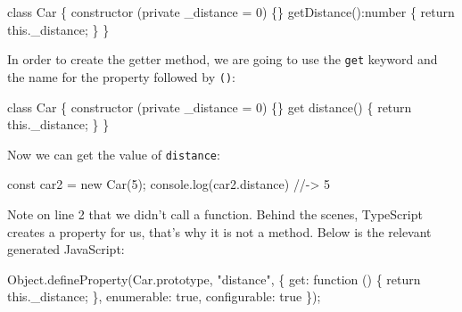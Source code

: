 \documentclass[12pt,]{article}
\newenvironment{Shaded}{}{}
\newcommand{\KeywordTok}[1]{\textcolor[rgb]{0.00,0.00,1.00}{{#1}}}
\newcommand{\DataTypeTok}[1]{{#1}}
\newcommand{\DecValTok}[1]{{#1}}
\newcommand{\StringTok}[1]{\textcolor[rgb]{0.00,0.50,0.50}{{#1}}}
\newcommand{\CommentTok}[1]{\textcolor[rgb]{0.00,0.50,0.00}{{#1}}}
\newcommand{\FunctionTok}[1]{{#1}}
\newcommand{\VariableTok}[1]{{#1}}
\newcommand{\ControlFlowTok}[1]{\textcolor[rgb]{0.00,0.00,1.00}{{#1}}}
\newcommand{\OperatorTok}[1]{{#1}}
\newcommand{\AttributeTok}[1]{{#1}}
\newcommand{\NormalTok}[1]{{#1}}
\begin{document}
\begin{Shaded}
\begin{Highlighting}[numbers=left,,]
\KeywordTok{class} \NormalTok{Car \{}
  \FunctionTok{constructor} \NormalTok{(}\KeywordTok{private} \NormalTok{_distance = }\DecValTok{0}\NormalTok{) \{\}}
  \FunctionTok{getDistance}\NormalTok{():number \{ }\KeywordTok{return} \KeywordTok{this}\NormalTok{.}\FunctionTok{_distance}\NormalTok{; \}}
\NormalTok{\}}
\end{Highlighting}
\end{Shaded}

In order to create the getter method, we are going to use the
\texttt{get} keyword and the name for the property followed by
\texttt{()}:

\begin{Shaded}
\begin{Highlighting}[numbers=left,,]
\KeywordTok{class} \NormalTok{Car \{}
  \FunctionTok{constructor} \NormalTok{(}\KeywordTok{private} \NormalTok{_distance = }\DecValTok{0}\NormalTok{) \{\}}
  \NormalTok{get }\FunctionTok{distance}\NormalTok{() \{ }\KeywordTok{return} \KeywordTok{this}\NormalTok{.}\FunctionTok{_distance}\NormalTok{; \}}
\NormalTok{\}}
\end{Highlighting}
\end{Shaded}

Now we can get the value of \texttt{distance}:

\begin{Shaded}
\begin{Highlighting}[numbers=left,,]
\DataTypeTok{const} \NormalTok{car2 = }\KeywordTok{new} \FunctionTok{Car}\NormalTok{(}\DecValTok{5}\NormalTok{);}
\NormalTok{console.}\FunctionTok{log}\NormalTok{(car2.}\FunctionTok{distance}\NormalTok{) }\CommentTok{//-> 5}
\end{Highlighting}
\end{Shaded}

Note on line 2 that we didn't call a function. Behind the scenes,
TypeScript creates a property for us, that's why it is not a method.
Below is the relevant generated JavaScript:

\begin{Shaded}
\begin{Highlighting}[numbers=left,,]
\VariableTok{Object}\NormalTok{.}\AttributeTok{defineProperty}\NormalTok{(}\VariableTok{Car}\NormalTok{.}\AttributeTok{prototype}\OperatorTok{,} \StringTok{"distance"}\OperatorTok{,} \OperatorTok{\{}
  \DataTypeTok{get}\OperatorTok{:} \KeywordTok{function} \NormalTok{() }\OperatorTok{\{} \ControlFlowTok{return} \KeywordTok{this}\NormalTok{.}\AttributeTok{_distance}\OperatorTok{;} \OperatorTok{\},}
  \DataTypeTok{enumerable}\OperatorTok{:} \KeywordTok{true}\OperatorTok{,}
  \DataTypeTok{configurable}\OperatorTok{:} \KeywordTok{true}
\OperatorTok{\}}\NormalTok{)}\OperatorTok{;}
\end{Highlighting}
\end{Shaded}
\end{document}
